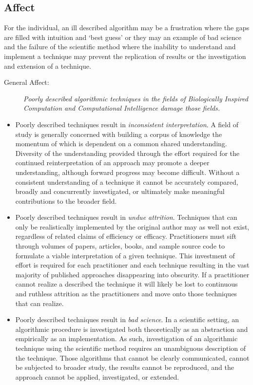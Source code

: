 \documentclass[a4paper, 11pt]{article}
\begin{document}
\subsection{Affect}
For the individual, an ill described algorithm may be a frustration where the gaps are filled with intuition and `best guess' or they may an example of bad science and the failure of the scientific method where the inability to understand and implement a technique may prevent the replication of results or the investigation and extension of a technique. 

\begin{description}
	\item[General Affect:]\emph{Poorly described algorithmic techniques in the fields of Biologically Inspired Computation and Computational Intelligence damage those fields.}
\end{description}

\begin{itemize}
	\item Poorly described techniques result in \emph{inconsistent interpretation}. A field of study is generally concerned with building a corpus of knowledge the momentum of which is dependent on a common shared understanding. Diversity of the understanding provided through the effort required for the continued reinterpretation of an approach may promote a deeper understanding, although forward progress may become difficult. Without a consistent understanding of a technique it cannot be accurately compared, broadly and concurrently investigated, or ultimately make meaningful contributions to the broader field. 
	\item Poorly described techniques result in \emph{undue attrition}. Techniques that can only be realistically implemented by the original author may as well not exist, regardless of related claims of efficiency or efficacy. Practitioners must sift through volumes of papers, articles, books, and sample source code to formulate a viable interpretation of a given technique. This investment of effort is required for each practitioner and each technique resulting in the vast majority of published approaches disappearing into obscurity. If a practitioner cannot realize a described the technique it will likely be lost to continuous and ruthless attrition as the practitioners and move onto those techniques that can realize.
	\item Poorly described techniques result in \emph{bad science}. In a scientific setting, an algorithmic procedure is investigated both theoretically as an abstraction and empirically as an implementation. As such, investigation of an algorithmic technique using the scientific method requires an unambiguous description of the technique. Those algorithms that cannot be clearly communicated, cannot be subjected to broader study, the results cannot be reproduced, and the approach cannot be applied, investigated, or extended. 
\end{itemize}
\end{document}
